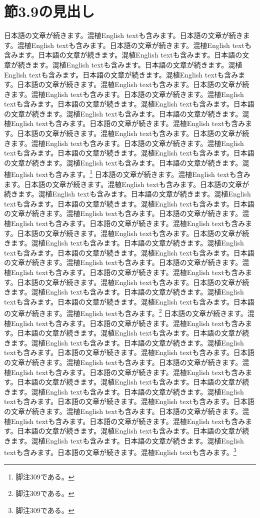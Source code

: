 \documentclass[pdflatex,book]{jlreq}
\begin{document}
\section{節3.9の見出し}
日本語の文章が続きます。混植English textも含みます。日本語の文章が続きます。混植English textも含みます。日本語の文章が続きます。混植English textも含みます。日本語の文章が続きます。混植English textも含みます。日本語の文章が続きます。混植English textも含みます。日本語の文章が続きます。混植English textも含みます。日本語の文章が続きます。混植English textも含みます。日本語の文章が続きます。混植English textも含みます。日本語の文章が続きます。混植English textも含みます。日本語の文章が続きます。混植English textも含みます。日本語の文章が続きます。混植English textも含みます。日本語の文章が続きます。混植English textも含みます。日本語の文章が続きます。混植English textも含みます。日本語の文章が続きます。混植English textも含みます。日本語の文章が続きます。混植English textも含みます。日本語の文章が続きます。混植English textも含みます。日本語の文章が続きます。混植English textも含みます。日本語の文章が続きます。混植English textも含みます。日本語の文章が続きます。混植English textも含みます。日本語の文章が続きます。混植English textも含みます。\footnote{脚注309である。}
日本語の文章が続きます。混植English textも含みます。日本語の文章が続きます。混植English textも含みます。日本語の文章が続きます。混植English textも含みます。日本語の文章が続きます。混植English textも含みます。日本語の文章が続きます。混植English textも含みます。日本語の文章が続きます。混植English textも含みます。日本語の文章が続きます。混植English textも含みます。日本語の文章が続きます。混植English textも含みます。日本語の文章が続きます。混植English textも含みます。日本語の文章が続きます。混植English textも含みます。日本語の文章が続きます。混植English textも含みます。日本語の文章が続きます。混植English textも含みます。日本語の文章が続きます。混植English textも含みます。日本語の文章が続きます。混植English textも含みます。日本語の文章が続きます。混植English textも含みます。日本語の文章が続きます。混植English textも含みます。日本語の文章が続きます。混植English textも含みます。日本語の文章が続きます。混植English textも含みます。日本語の文章が続きます。混植English textも含みます。日本語の文章が続きます。混植English textも含みます。\footnote{脚注309である。}
日本語の文章が続きます。混植English textも含みます。日本語の文章が続きます。混植English textも含みます。日本語の文章が続きます。混植English textも含みます。日本語の文章が続きます。混植English textも含みます。日本語の文章が続きます。混植English textも含みます。日本語の文章が続きます。混植English textも含みます。日本語の文章が続きます。混植English textも含みます。日本語の文章が続きます。混植English textも含みます。日本語の文章が続きます。混植English textも含みます。日本語の文章が続きます。混植English textも含みます。日本語の文章が続きます。混植English textも含みます。日本語の文章が続きます。混植English textも含みます。日本語の文章が続きます。混植English textも含みます。日本語の文章が続きます。混植English textも含みます。日本語の文章が続きます。混植English textも含みます。日本語の文章が続きます。混植English textも含みます。日本語の文章が続きます。混植English textも含みます。日本語の文章が続きます。混植English textも含みます。日本語の文章が続きます。混植English textも含みます。日本語の文章が続きます。混植English textも含みます。\footnote{脚注309である。}
\end{document}
